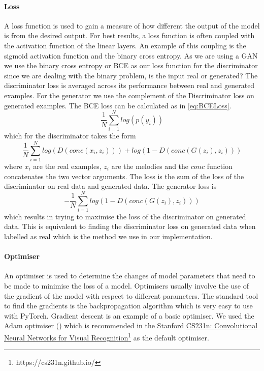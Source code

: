 \paragraph{Loss}
A loss function is used to gain a measure of how different the output of the model is from the desired output.
For best results, a loss function is often coupled with the activation function of the linear layers.
An example of this coupling is the sigmoid activation function and the binary cross entropy. %
As we are using a GAN we use the binary cross entropy or BCE as our loss function for the discriminator since we are dealing with the binary problem, is the input real or generated?
The discriminator loss is averaged across its performance between real and generated examples.
For the generator we use the complement of the Discriminator loss on generated examples.
The BCE loss can be calculated as in \cref{eq:BCELoss}.
\begin{equation}
    \label{eq:BCELoss}
    \frac{1}{N} \sum_{i=1}^N log(p(y_i))
\end{equation}
    which for the discriminator takes the form
\begin{equation}
    \frac{1}{N} \sum_{i=1}^N log(D(conc(x_i,z_i))) + log(1-D(conc(G(z_i),z_i)))
\end{equation}
    where $x_i$ are the real examples, $z_i$ are the melodies and the $conc$ function concatenates the two vector arguments.
    The loss is the sum of the loss of the discriminator on real data and generated data.
    The generator loss is
\begin{equation}
    -\frac{1}{N} \sum_{i=1}^N log(1-D(conc(G(z_i),z_i)))
\end{equation}
    which results in trying to maximise the loss of the discriminator on generated data.
    This is equivalent to finding the discriminator loss on generated data when labelled as real which is the method we use in our implementation.

    
\paragraph{Optimiser}
An optimiser is used to determine the changes of model parameters that need to be made to minimise the loss of a model.
Optimisers usually involve the use of the gradient of the model with respect to different parameters.
The standard tool to find the gradients is the backpropagation algorithm 
which is very easy to use with PyTorch.
Gradient descent is an example of a basic optimiser.
We used the Adam optimiser (\cite{Adam}) which is recommended in the Stanford \href{https://cs231n.github.io/}{CS231n: Convolutional Neural Networks for Visual Recognition}\footnote{https://cs231n.github.io/} as the default optimiser.




